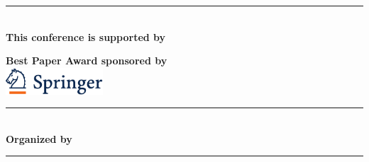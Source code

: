 \begin{center}
\vspace{5mm}
\rule{12cm}{1pt}\\[12pt]
\textsf{\textbf{\Large This conference is supported by}}\\
\vspace{2mm}

\hspace{\separationwidth}
\hspace{\separationwidth}



\vspace{7mm}
\textsf{\textbf{\Large Best Paper Award sponsored by}}\\
\vspace{3mm}
\includegraphics[height=1cm]{local_img/sponsors/Springer_cmyk}
\\

\rule{12cm}{1pt}\\[10pt]
\textsf{\textbf{\Large Organized by }}
\hspace{2mm}

\vspace{5mm}
\rule{12cm}{1pt}\\[10pt]
\end{center}
